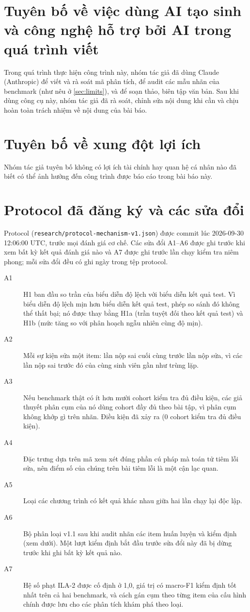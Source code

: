 \documentclass[a4paper,preprint,12pt,authoryear]{elsarticle}
\begin{document}
\section*{Tuyên bố về việc dùng AI tạo sinh và công nghệ hỗ trợ bởi AI trong quá trình viết}
Trong quá trình thực hiện công trình này, nhóm tác giả đã dùng Claude (Anthropic) để viết và rà soát mã phân tích, để audit các mẫu nhãn của benchmark (như nêu ở \cref{sec:limits}), và để soạn thảo, biên tập văn bản. Sau khi dùng công cụ này, nhóm tác giả đã rà soát, chỉnh sửa nội dung khi cần và chịu hoàn toàn trách nhiệm về nội dung của bài báo.

\section*{Tuyên bố về xung đột lợi ích}
Nhóm tác giả tuyên bố không có lợi ích tài chính hay quan hệ cá nhân nào đã biết có thể ảnh hưởng đến công trình được báo cáo trong bài báo này.


\appendix
\section{Protocol đã đăng ký và các sửa đổi}\label{app:protocol}

Protocol (\texttt{research/protocol-mechanism-v1.json}) được commit lúc 2026-09-30 12:06:00 UTC, trước mọi đánh giá cơ chế. Các sửa đổi A1--A6 được ghi trước khi xem bất kỳ kết quả đánh giá nào và A7 được ghi trước lần chạy kiểm tra niêm phong; mỗi sửa đổi đều có ghi ngày trong tệp protocol.
\begin{description}
\item[A1] H1 ban đầu so trần của biểu diễn độ lệch với biểu diễn kết quả test. Vì biểu diễn độ lệch mịn hơn biểu diễn kết quả test, phép so sánh đó không thể thất bại; nó được thay bằng H1a (trần tuyệt đối theo kết quả test) và H1b (mức tăng so với phân hoạch ngẫu nhiên cùng độ mịn).
\item[A2] Mỗi sự kiện sửa một item: lần nộp sai cuối cùng trước lần nộp sửa, vì các lần nộp sai trước đó của cùng sinh viên gần như trùng lặp.
\item[A3] Nếu benchmark thật có ít hơn mười cohort kiểm tra đủ điều kiện, các giả thuyết phân cụm của nó dùng cohort đầy đủ theo bài tập, vì phân cụm không khớp gì trên nhãn. Điều kiện đã xảy ra (0 cohort kiểm tra đủ điều kiện).
\item[A4] Đặc trưng dựa trên mã xem xét đúng phần cú pháp mà toán tử tiêm lỗi sửa, nên điểm số của chúng trên bài tiêm lỗi là một cận lạc quan.
\item[A5] Loại các chương trình có kết quả khác nhau giữa hai lần chạy lại độc lập.
\item[A6] Bộ phân loại v1.1 sau khi audit nhãn các item huấn luyện và kiểm định (xem dưới). Một lượt kiểm định bắt đầu trước sửa đổi này đã bị dừng trước khi ghi bất kỳ kết quả nào.
\item[A7] Hệ số phạt ILA-2 được cố định ở 1,0, giá trị có macro-F1 kiểm định tốt nhất trên cả hai benchmark, và cách gán cụm theo từng item của cấu hình chính được lưu cho các phân tích khám phá theo loại.
\end{description}
\end{document}
